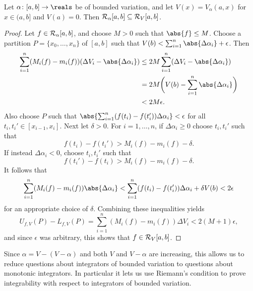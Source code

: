\documentclass[article, a4paper, 11pt, oneside]{memoir}
\numberwithin{equation}{chapter}
\begin{document}
\begin{theorem}
    \label{thm:alpha-integrable-implies-V-integrable}
    Let $\alpha \colon [a,b] \to \reals$ be of bounded variation, and let $V(x) = V_\alpha(a,x)$ for $x \in (a,b]$ and $V(a) = 0$. Then $\integrable[\alpha]{a,b} \subseteq \integrable[V]{a,b}$.
\end{theorem}

\begin{proof}
    Let $f \in \integrable[\alpha]{a,b}$, and choose $M > 0$ such that $\abs{f} \leq M$. Choose a partition $P = \{x_0, \ldots, x_n\}$ of $[a,b]$ such that $V(b) < \sum_{i=1}^n \abs{\Delta\alpha_i} + \epsilon$. Then
    \begin{align*}
        \sum_{i=1}^n (M_i(f) - m_i(f)) ( \Delta V_i - \abs{\Delta\alpha_i})
            &\leq 2M \sum_{i=1}^n (\Delta V_i - \abs{\Delta\alpha_i}) \\
            &= 2M \biggl( V(b) - \sum_{i=1}^n \abs{\Delta\alpha_i} \biggr) \\
            &< 2M \epsilon.
    \end{align*}
    Also choose $P$ such that $\abs{ \sum_{i=1}^n (f(t_i) - f(t_i')) \Delta\alpha_i } < \epsilon$ for all $t_i, t_i' \in [x_{i-1}, x_i]$. Next let $\delta > 0$. For $i = 1, \ldots, n$, if $\Delta\alpha_i \geq 0$ choose $t_i, t_i'$ such that
    \begin{equation*}
        f(t_i) - f(t_i')
            > M_i(f) - m_i(f) - \delta.
    \end{equation*}
    If instead $\Delta\alpha_i < 0$, choose $t_i, t_i'$ such that
    \begin{equation*}
        f(t_i') - f(t_i)
            > M_i(f) - m_i(f) - \delta.
    \end{equation*}
    It follows that
    \begin{equation*}
        \sum_{i=1}^n (M_i(f) - m_i(f)) \abs{\Delta\alpha_i}
            < \sum_{i=1}^n (f(t_i) - f(t_i')) \Delta\alpha_i
              + \delta V(b)
            < 2 \epsilon
    \end{equation*}
    for an appropriate choice of $\delta$. Combining these inequalities yields
    \begin{equation*}
        U_{f,V}(P) - L_{f,V}(P)
            = \sum_{i=1}^n (M_i(f) - m_i(f)) \Delta V_i
            < 2(M+1)\epsilon,
    \end{equation*}
    and since $\epsilon$ was arbitrary, this shows that $f \in \integrable[V]{a,b}$.
\end{proof}
%
Since $\alpha = V - (V - \alpha)$ and both $V$ and $V - \alpha$ are increasing, this allows us to reduce questions about integrators of bounded variation to questions about monotonic integrators. In particular it lets us use Riemann's condition to prove integrability with respect to integrators of bounded variation.
\end{document}
